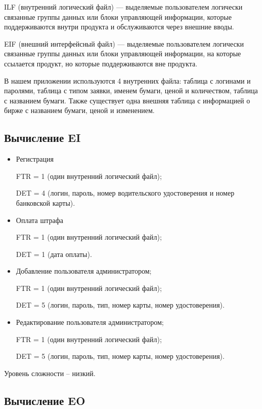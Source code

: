 ILF (внутренний логический файл) --- выделяемые пользователем логически связанные группы данных или блоки управляющей информации, которые поддерживаются внутри продукта и обслуживаются через внешние вводы.

EIF (внешний интерфейсный файл) --- выделяемые пользователем логически связанные группы данных или блоки управляющей информации, на которые ссылается продукт, но которые поддерживаются вне продукта.

В нашем приложении используются 4 внутренних файла: таблица с логинами и паролями, таблица с типом заявки, именем бумаги, ценой и количеством, таблица с названием бумаги. Также существует одна внешняя
таблица с информацией о бирже с названием бумаги, ценой и изменением.

\subsection*{Вычисление EI}
\begin{itemize}[label = ---]
    \item Регистрация
    
    FTR = 1 (один внутренний логический файл);
    
    DET = 4 (логин, пароль, номер водительского удостоверения и номер банковской карты).
    
    \item Оплата штрафа
    
    FTR = 1 (один внутренний логический файл);
    
    DET = 1 (дата оплаты).

    \item Добавление пользователя администратором;
    
    FTR = 1 (один внутренний логический файл);
    
    DET = 5 (логин, пароль, тип, номер карты, номер удостоверения).

    \item Редактирование пользователя администратором;
    
    FTR = 1 (один внутренний логический файл);
    
    DET = 5 (логин, пароль, тип, номер карты, номер удостоверения).
        
\end{itemize}

Уровень сложности – низкий.

\subsection*{Вычисление EO}

